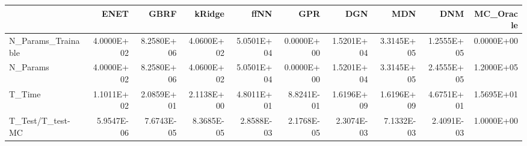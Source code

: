 \begin{tabular}{lrrrrrrrrr}
\toprule
{} &       ENET &       GBRF &     kRidge &       ffNN &        GPR &        DGN &        MDN &        DNM &  MC\_Oracle \\
\midrule
N\_Params\_Trainable & 4.0000E+02 & 8.2580E+06 & 4.0600E+02 & 5.0501E+04 & 0.0000E+00 & 1.5201E+04 & 3.3145E+05 & 1.2555E+05 & 0.0000E+00 \\
N\_Params           & 4.0000E+02 & 8.2580E+06 & 4.0600E+02 & 5.0501E+04 & 0.0000E+00 & 1.5201E+04 & 3.3145E+05 & 2.4555E+05 & 1.2000E+05 \\
T\_Time             & 1.1011E+02 & 2.0859E+01 & 2.1138E+00 & 4.8011E+01 & 8.8241E-01 & 1.6196E+09 & 1.6196E+09 & 4.6751E+01 & 1.5695E+01 \\
T\_Test/T\_test-MC   & 5.9547E-06 & 7.6743E-05 & 8.3685E-05 & 2.8588E-03 & 2.1768E-05 & 2.3074E-03 & 7.1332E-03 & 2.4091E-03 & 1.0000E+00 \\
\bottomrule
\end{tabular}
